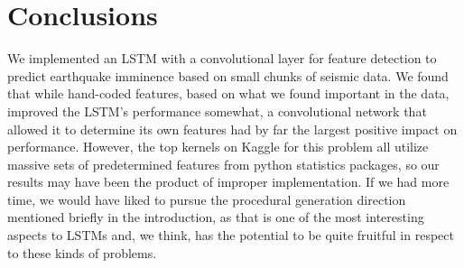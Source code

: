\documentclass[11pt]{article}
\begin{document}
 

\section{Conclusions}
We implemented an LSTM with a convolutional layer for feature detection to predict earthquake imminence based on small chunks of seismic data. We found that while hand-coded features, based on what we found important in the data, improved the LSTM's performance somewhat, a convolutional network that allowed it 
to determine its own features had by far the largest positive impact on performance. However, the top kernels on Kaggle for this problem all utilize massive sets of predetermined features from python statistics packages, so our results may have been the product of improper implementation. If we had more time, we would have liked to pursue the procedural generation direction mentioned briefly in the 
introduction, as that is one of the most interesting aspects to LSTMs and, we think, has the potential to be quite fruitful in respect
to these kinds of problems.
\end{document}
